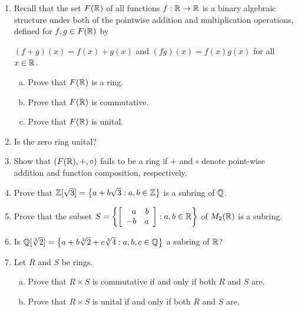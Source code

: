 \documentclass[11pt,fleqn,dvipsnames,usenames]{article}
\newcommand{\p}{\noindent}
\begin{document}
\begin{enumerate}[1.]
\item Recall that the set $F(\R)$ of all functions $f:\R\to\R$ is a binary algebraic structure under both of the pointwise addition and multiplication operations, defined for $f,g\in F(\R)$ by
\begin{center}
$(f+g)(x) = f(x) + g(x)$ and $(fg)(x) = f(x)g(x)$ for all $x\in \R$.
\end{center}
\begin{enumerate}[(a)]
\item Prove that $F(\R)$ is a ring.
\item Prove that $F(\R)$ is commutative.
\item Prove that $F(\R)$ is unital.
\end{enumerate}

\item Is the zero ring unital?

\item Show that $(F(\R),+,\circ)$ fails to be a ring if $+$ and $\circ$ denote point-wise addition and function composition, respectively.
\item Prove that $\Z[\sqrt{3}] = \SET{a + b\sqrt{3}:a,b\in\Z}$ is a subring of $\Q$.
\item Prove that the subset $S = \SET{\MATRIX{rr}{a & b\\-b & a}:a,b\in \R}$ of $M_{2}(\R)$ is a subring.
\item Is $\Q[\sqrt[3]{2}] = \SET{a + b\sqrt[3]{2} + c\sqrt[3]{4}:a,b,c\in\Q}$ a subring of $\R$?
\item Let $R$ and $S$ be rings.
\begin{enumerate}[(a)]
\item Prove that $R\times S$ is commutative if and only if both $R$ and $S$ are.
\item Prove that $R\times S$ is unital if and only if both $R$ and $S$ are.
\end{enumerate}
\end{enumerate}
\vsp

\newpage

\p {\huge \S4.4 Problems}
\vsp
\end{document}
